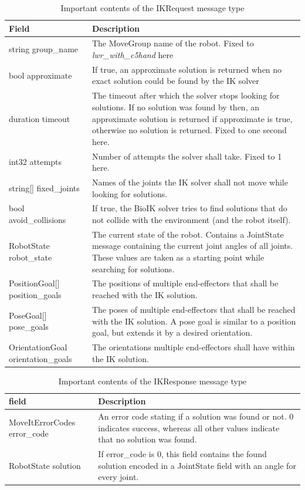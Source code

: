 \begin{table}
	\caption{Important contents of the IKRequest message type\label{tab:msg:ikrequest}}
	\begin{tabularx}{\linewidth}{|l|X|}
		\hline
		\textbf{Field} & \textbf{Description} \\
		\hline
		string group\_name & The MoveGroup name of the robot. Fixed to \textit{lwr\_with\_c5hand} here \\
		\hline
		bool approximate & If true, an approximate solution is returned when no exact solution could be found by the IK solver \\
		\hline
		duration timeout & The timeout after which the solver stops looking for solutions. If no solution was found by then, an approximate solution is returned if approximate is true, otherwise no solution is returned. Fixed to one second here. \\
		\hline
		int32 attempts & Number of attempts the solver shall take. Fixed to 1 here. \\
		\hline
		string[] fixed\_joints & Names of the joints the IK solver shall not move while looking for solutions. \\
		\hline
		bool avoid\_collisions & If true, the BioIK solver tries to find solutions that do not collide with the environment (and the robot itself). \\
		\hline
		RobotState robot\_state & The current state of the robot. Contains a JointState message containing the current joint angles of all joints. These values are taken as a starting point while searching for solutions. \\
		\hline
		PositionGoal[] position\_goals & The positions of multiple end-effectors that shall be reached with the IK solution. \\
		\hline
		PoseGoal[] pose\_goals & The poses of multiple end-effectors that shall be reached with the IK solution. A pose goal is similar to a position goal, but extends it by a desired orientation. \\
		\hline
		OrientationGoal orientation\_goals & The orientations multiple end-effectors shall have within the IK solution. \\
		\hline
	\end{tabularx}
\end{table}

\begin{table}
	\caption{Important contents of the IKResponse message type\label{tab:msg:ikresponse}}
	\begin{tabularx}{\linewidth}{|l|X|}
		\hline
		\textbf{field} & \textbf{Description} \\
		\hline
		MoveItErrorCodes error\_code & An error code stating if a solution was found or not. 0 indicates success, whereas all other values indicate that no solution was found. \\
		\hline
		RobotState solution & If error\_code is 0, this field contains the found solution encoded in a JointState field with an angle for every joint. \\
		\hline
	\end{tabularx}
\end{table}

